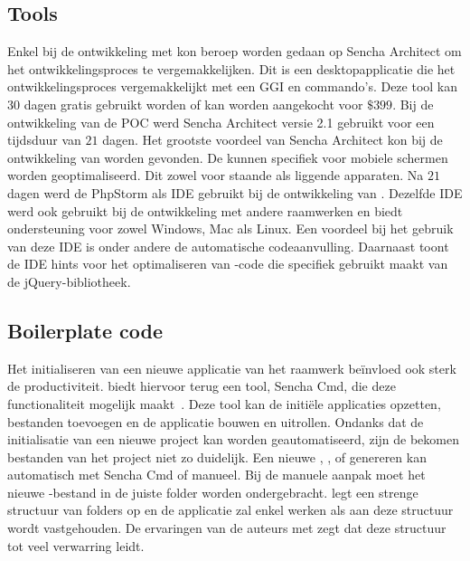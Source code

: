 \subsection{Tools}
Enkel bij de ontwikkeling met \st{} kon beroep worden gedaan op Sencha Architect om het ontwikkelingsproces te vergemakkelijken.
Dit is een desktopapplicatie die het ontwikkelingsproces vergemakkelijkt met een GGI en  commando's.  
Deze tool kan 30 dagen gratis gebruikt worden of kan worden aangekocht voor $\$399$.
Bij de ontwikkeling van de POC werd Sencha Architect versie 2.1 gebruikt voor een tijdsduur van $21$ dagen.
Het grootste voordeel van Sencha Architect kon bij de ontwikkeling van  worden gevonden.
De  kunnen specifiek voor mobiele schermen worden geoptimaliseerd.
Dit zowel voor staande als liggende apparaten.
Na $21$ dagen werd de PhpStorm als IDE gebruikt bij de ontwikkeling van \st{}.
Dezelfde IDE werd ook gebruikt bij de ontwikkeling met andere raamwerken en biedt ondersteuning voor zowel Windows, Mac als Linux.
Een voordeel bij het gebruik van deze IDE is onder andere de automatische codeaanvulling.
Daarnaast toont de IDE hints voor het optimaliseren van \js{}-code die specifiek gebruikt maakt van de jQuery-bibliotheek.

\subsection{Boilerplate code}
Het initialiseren van een nieuwe applicatie van het raamwerk beïnvloed ook sterk de productiviteit.
\st{} biedt hiervoor terug een tool,  Sencha Cmd,  die deze functionaliteit mogelijk maakt~\cite{Sencha2012}.
Deze tool kan de initiële applicaties opzetten,  bestanden toevoegen en de applicatie bouwen en uitrollen.
Ondanks dat de initialisatie van een nieuwe project kan worden geautomatiseerd, zijn de bekomen bestanden van het project niet zo duidelijk.
Een nieuwe ,  ,   of  genereren kan automatisch met Sencha Cmd of manueel.
Bij de manuele aanpak moet het nieuwe \js-bestand in de juiste folder worden ondergebracht.
\st{} legt een strenge structuur van folders op en de applicatie zal enkel werken als aan deze structuur wordt vastgehouden.
De ervaringen van de auteurs met \st{} zegt dat deze structuur tot veel verwarring leidt.

